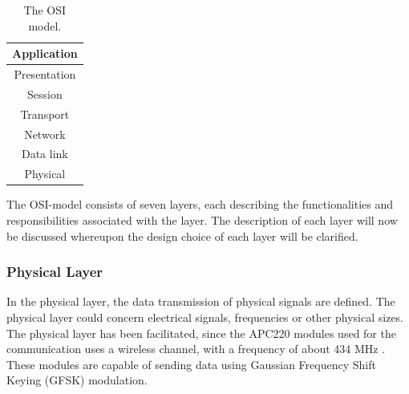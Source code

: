 \begin{table}[H]
\centering

\begin{tabular}{c}
\hline
\multicolumn{1}{|M{0.3\textwidth}|}{Application}   \\ \hline
\multicolumn{1}{|M{0.3\textwidth}|}{Presentation}  \\ \hline
\multicolumn{1}{|M{0.3\textwidth}|}{Session} \\ \hline

\multicolumn{1}{|M{0.3\textwidth}|}{Transport} \\ \hline

\multicolumn{1}{|M{0.3\textwidth}|}{Network} \\ \hline

\multicolumn{1}{|M{0.3\textwidth}|}{Data link} \\ \hline

\multicolumn{1}{|M{0.3\textwidth}|}{Physical} \\ \hline
\end{tabular}
\caption{The OSI model.}
\label{osimodel}
\end{table}

%
%
%
%
%
%

The OSI-model consists of seven layers, each describing the functionalities and responsibilities associated with the layer. The description of each layer will now be discussed whereupon the design choice of each layer will be clarified. 


\subsubsection*{Physical Layer}
In the physical layer, the data transmission of physical signals are defined. The physical layer could concern electrical signals, frequencies or other physical sizes. The physical layer has been facilitated, since the APC220 modules used for the communication uses a wireless channel, with a frequency of about 434 MHz \citep[p. 3]{APC220}. These modules are capable of sending data using Gaussian Frequency Shift Keying (GFSK) modulation. %

